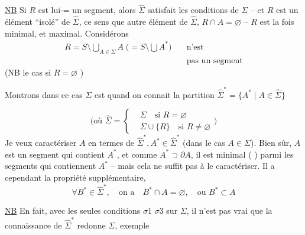 \uline{NB} Si $R$ est lui-= un segment, alors  $\widehat\Sigma$ satisfait les conditions de $\Sigma$ -- et $R$ est un élément  ``isolé'' de $\widehat\Sigma$,  ce sens que   autre élément  de $\widehat\Sigma$,   $R\cap A=\varnothing$ --   $R$ est  la fois minimal, et maximal. Considérons
\begingroup
\makeatletter\tagsleft@true\makeatother
\[
 \tag*{$(\sigma\ 3)$}
 \begin{aligned}
 R=S\setminus\bigcup_{A\in\Sigma}A\;
 \bigl(=S\setminus\bigcup A^*\bigr)&\quad\text{n'est}\\
 &\quad\text{pas un segment}
 \end{aligned}
\]
\endgroup
(NB  le cas si $R=\varnothing$ )

Montrons dans ce cas   $\Sigma$ est   quand on connait la partition $\widehat\Sigma^*=\{A^*\mid A\in\widehat\Sigma\}$

\[
 \bigl(\text{où }\widehat\Sigma=\left\{\begin{aligned}
 &\Sigma\quad\text{si }R=\varnothing\\
 &\Sigma\cup\{R\}\quad\text{si }R\ne\varnothing
 \end{aligned}\right.\bigr)
\]
Je veux caractériser $A$ en termes de $\widehat\Sigma^*, A^*\in\widehat\Sigma^*$ (dans le cas $A\in\Sigma$). Bien sûr, $A$ est un  segment qui contient $A^*$, et comme $A^*\supset\partial A$, il est minimal ( ) parmi les segments  qui contiennent $A^*$ -- mais cela ne suffit pas à le caractériser. Il a cependant la propriété supplémentaire,
\[
 \forall B^*\in\widehat\Sigma^*,\quad\text{on a}\quad B^*\cap A=\varnothing,\quad\text{ou }B^*\subset A
\]

\uline{NB} En fait, avec les seules conditions $\sigma1$  $\sigma3$ sur $\Sigma$,  il n'est pas vrai que la connaissance de $\widehat\Sigma^*$ redonne $\Sigma$, exemple

